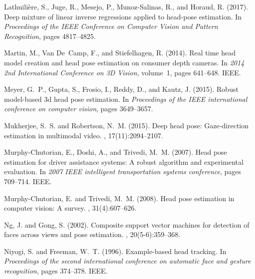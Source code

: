 \documentclass[a4paper,twoside]{article}
\begin{document}
{\begin{thebibliography}{}
Lathuili{\`e}re, S., Juge, R., Mesejo, P., Munoz-Salinas, R., and Horaud, R.
  (2017).
\newblock Deep mixture of linear inverse regressions applied to head-pose
  estimation.
\newblock In {\em Proceedings of the IEEE Conference on Computer Vision and
  Pattern Recognition}, pages 4817--4825.

Martin, M., Van De~Camp, F., and Stiefelhagen, R. (2014).
\newblock Real time head model creation and head pose estimation on consumer
  depth cameras.
\newblock In {\em 2014 2nd International Conference on 3D Vision}, volume~1,
  pages 641--648. IEEE.

Meyer, G.~P., Gupta, S., Frosio, I., Reddy, D., and Kautz, J. (2015).
\newblock Robust model-based 3d head pose estimation.
\newblock In {\em Proceedings of the IEEE international conference on computer
  vision}, pages 3649--3657.

Mukherjee, S.~S. and Robertson, N.~M. (2015).
\newblock Deep head pose: Gaze-direction estimation in multimodal video.
, 17(11):2094--2107.

Murphy-Chutorian, E., Doshi, A., and Trivedi, M.~M. (2007).
\newblock Head pose estimation for driver assistance systems: A robust
  algorithm and experimental evaluation.
\newblock In {\em 2007 IEEE intelligent transportation systems conference},
  pages 709--714. IEEE.

Murphy-Chutorian, E. and Trivedi, M.~M. (2008).
\newblock Head pose estimation in computer vision: A survey.
,
  31(4):607--626.

Ng, J. and Gong, S. (2002).
\newblock Composite support vector machines for detection of faces across views
  and pose estimation.
, 20(5-6):359--368.

Niyogi, S. and Freeman, W.~T. (1996).
\newblock Example-based head tracking.
\newblock In {\em Proceedings of the second international conference on
  automatic face and gesture recognition}, pages 374--378. IEEE.


\end{thebibliography}}
\end{document}
